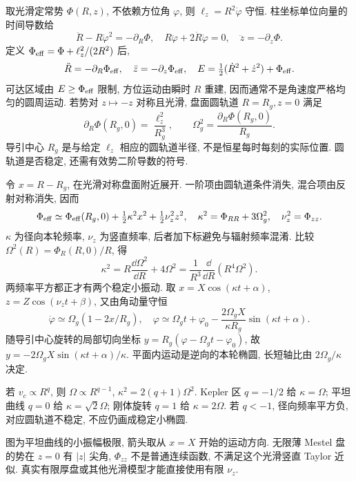 取光滑定常势 $\Phi(R,z)$, 不依赖方位角 $\varphi$, 则 $\ell_z=R^2\dot\varphi$ 守恒. 柱坐标单位向量的时间导数给
\[
\ddot R-R\dot\varphi^2=-\partial_R\Phi,
\quad R\ddot\varphi+2\dot R\dot\varphi=0,
\quad\ddot z=-\partial_z\Phi.
\]
定义 $\Phi_{\rm eff}=\Phi+\ell_z^2/(2R^2)$ 后,
\[
\ddot R=-\partial_R\Phi_{\rm eff},\quad
\ddot z=-\partial_z\Phi_{\rm eff},\quad
E=\tfrac12(\dot R^2+\dot z^2)+\Phi_{\rm eff}.
\]
可达区域由 $E\ge\Phi_{\rm eff}$ 限制, 方位运动由瞬时 $R$ 重建, 因而通常不是角速度严格均匀的圆周运动. 若势对 $z\mapsto-z$ 对称且光滑, 盘面圆轨道 $R=R_g,z=0$ 满足
\[
\partial_R\Phi(R_g,0)=\frac{\ell_z^2}{R_g^3},
\qquad \Omega_g^2=\frac{\partial_R\Phi(R_g,0)}{R_g}.
\]
导引中心 $R_g$ 是与给定 $\ell_z$ 相应的圆轨道半径, 不是恒星每时每刻的实际位置. 圆轨道是否稳定, 还需有效势二阶导数的符号.

令 $x=R-R_g$, 在光滑对称盘面附近展开. 一阶项由圆轨道条件消失, 混合项由反射对称消失, 因而
\[
\Phi_{\rm eff}\simeq\Phi_{\rm eff}(R_g,0)+\tfrac12\kappa^2x^2+\tfrac12\nu_z^2z^2,
\quad
\kappa^2=\Phi_{RR}+3\Omega_g^2,\quad \nu_z^2=\Phi_{zz}.
\]
$\kappa$ 为径向本轮频率, $\nu_z$ 为竖直频率, 后者加下标避免与辐射频率混淆. 比较 $\Omega^2(R)=\Phi_R(R,0)/R$, 得
\begin{equation}\label{eq:epicycle}
\kappa^2=R\frac{\dd\Omega^2}{\dd R}+4\Omega^2
=\frac1{R^3}\frac{\dd}{\dd R}(R^4\Omega^2).
\end{equation}
两频率平方都正才有两个稳定小振动. 取 $x=X\cos(\kappa t+\alpha)$, $z=Z\cos(\nu_zt+\beta)$, 又由角动量守恒
\[
\dot\varphi\simeq\Omega_g(1-2x/R_g),\quad
\varphi\simeq\Omega_gt+\varphi_0-
\frac{2\Omega_gX}{\kappa R_g}\sin(\kappa t+\alpha).
\]
随导引中心旋转的局部切向坐标 $y=R_g(\varphi-\Omega_gt-\varphi_0)$, 故 $y=-2\Omega_gX\sin(\kappa t+\alpha)/\kappa$. 平面内运动是逆向的本轮椭圆, 长短轴比由 $2\Omega_g/\kappa$ 决定.

\begin{example}
若 $v_c\propto R^q$, 则 $\Omega\propto R^{q-1}$, $\kappa^2=2(q+1)\Omega^2$. Kepler 区 $q=-1/2$ 给 $\kappa=\Omega$; 平坦曲线 $q=0$ 给 $\kappa=\sqrt2\Omega$; 刚体旋转 $q=1$ 给 $\kappa=2\Omega$. 若 $q<-1$, 径向频率平方负, 对应圆轨道不稳定, 不应仍画成稳定小椭圆.
\end{example}

\begin{center}
\end{center}
图为平坦曲线的小振幅极限, 箭头取从 $x=X$ 开始的运动方向. 无限薄 Mestel 盘的势在 $z=0$ 有 $|z|$ 尖角, $\Phi_{zz}$ 不是普通连续函数, 不满足这个光滑竖直 Taylor 近似. 真实有限厚盘或其他光滑模型才能直接使用有限 $\nu_z$.

